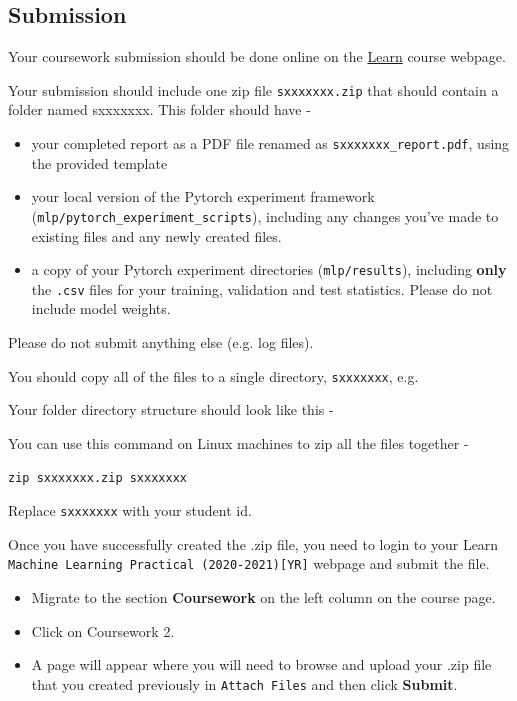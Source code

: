 \documentclass[11pt,]{article}
\begin{document}
\subsection{Submission}
\label{sec:submission}

Your coursework submission should be done online on the \href{https://www.learn.ed.ac.uk/}{Learn} course webpage.

Your submission should include one zip file \texttt{sxxxxxxx.zip} that should contain a folder named sxxxxxxx. This folder should have - 

\begin{itemize}


\item
  your completed report as a PDF file renamed as \texttt{sxxxxxxx\_report.pdf}, using the provided template
  
\item your local version of the Pytorch experiment framework (\texttt{mlp/pytorch\_experiment\_scripts}), including any changes you've made to existing files and any newly created files.
\item a copy of your Pytorch experiment directories (\texttt{mlp/results}), including \textbf{only} the \texttt{.csv} files for your training, validation and test statistics. Please do not include model weights.

\end{itemize}
Please do not submit anything else (e.g. log files).

You should copy all of the files to a single directory, \verb+sxxxxxxx+, e.g.

Your folder directory structure should look like this - 



You can use this command on Linux machines to zip all the files together - 

\texttt{zip sxxxxxxx.zip  sxxxxxxx}

Replace \texttt{sxxxxxxx} with your student id. 

Once you have successfully created the .zip file, you need to login to your Learn \texttt{Machine Learning Practical (2020-2021)[YR]} webpage and submit the file. 
\begin{itemize}
    \item Migrate to the section \textbf{Coursework} on the left column on the course page. 
    \item Click on Coursework 2.
    \item A page will appear where you will need to browse and upload your .zip file that you created previously in \texttt{Attach Files} and then click \textbf{Submit}. 
\end{itemize}
\end{document}
